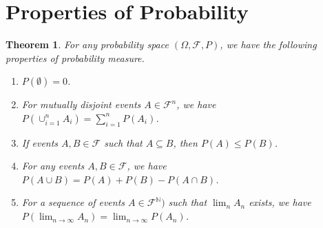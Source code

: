 \documentclass[letterpaper,10pt,english]{article}
\theoremstyle{plain}
\newtheorem{thm}{Theorem}[section]
\theoremstyle{definition}
\theoremstyle{remark}
\newcommand{\N}{\mathbb{N}}
\newcommand{\sF}{\mathscr{F}}
\renewcommand{\le}{\leqslant}
\begin{document}
\section{Properties of Probability}
\begin{thm}
For any probability space $(\Omega, \sF, P)$, 
we have the following properties of probability measure. 
\begin{enumerate}
\item [\textbf{impossibility:}] $P(\emptyset) = 0$.
\item [\textbf{finite additivity:}] For mutually disjoint events $A\in \sF^n$, 
we have $P(\cup_{i=1}^nA_i) = \sum_{i=1}^nP(A_i)$. 
\item [\textbf{monotonicity:}] If events $A, B \in \sF$ such that $A \subseteq B$, then $P(A) \le P(B)$. 
\item [\textbf{inclusion-exclusion:}] For any events $A, B \in \sF$, we have $P(A \cup B) = P(A) + P(B) - P(A \cap B)$.
\item [\textbf{continuity:}] For a sequence of events $A \in \sF^\N)$ such that $\lim_nA_n$ exists, we have $P(\lim_{n \to \infty}A_n) = \lim_{n \to \infty}P(A_n)$. 
\end{enumerate}
\end{thm}
\end{document}
